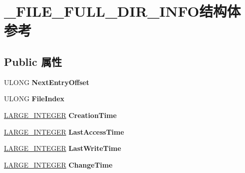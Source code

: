 \hypertarget{struct___f_i_l_e___f_u_l_l___d_i_r___i_n_f_o}{}\section{\+\_\+\+F\+I\+L\+E\+\_\+\+F\+U\+L\+L\+\_\+\+D\+I\+R\+\_\+\+I\+N\+F\+O结构体 参考}
\label{struct___f_i_l_e___f_u_l_l___d_i_r___i_n_f_o}
\subsection*{Public 属性}
\begin{DoxyCompactItemize}
\item 
\mbox{\label{struct___f_i_l_e___f_u_l_l___d_i_r___i_n_f_o_a79d90bdd316275b64276872554ab205f}} 
U\+L\+O\+NG {\bfseries Next\+Entry\+Offset}
\item 
\mbox{\label{struct___f_i_l_e___f_u_l_l___d_i_r___i_n_f_o_ab8c4d52027424e8cc7fbd58b5c1a8fe2}} 
U\+L\+O\+NG {\bfseries File\+Index}
\item 
\mbox{\label{struct___f_i_l_e___f_u_l_l___d_i_r___i_n_f_o_ab674d15099d26e9efe96e5d60fbb6e48}} 
\hyperlink{union___l_a_r_g_e___i_n_t_e_g_e_r}{L\+A\+R\+G\+E\+\_\+\+I\+N\+T\+E\+G\+ER} {\bfseries Creation\+Time}
\item 
\mbox{\label{struct___f_i_l_e___f_u_l_l___d_i_r___i_n_f_o_a55bdd588e1bcf9da9371621990f9866c}} 
\hyperlink{union___l_a_r_g_e___i_n_t_e_g_e_r}{L\+A\+R\+G\+E\+\_\+\+I\+N\+T\+E\+G\+ER} {\bfseries Last\+Access\+Time}
\item 
\mbox{\label{struct___f_i_l_e___f_u_l_l___d_i_r___i_n_f_o_a2b98780a6787b3d0cd150fe8e7f179bf}} 
\hyperlink{union___l_a_r_g_e___i_n_t_e_g_e_r}{L\+A\+R\+G\+E\+\_\+\+I\+N\+T\+E\+G\+ER} {\bfseries Last\+Write\+Time}
\item 
\mbox{\label{struct___f_i_l_e___f_u_l_l___d_i_r___i_n_f_o_a0d28e6be2e8987443bc253a2c52f9b85}} 
\hyperlink{union___l_a_r_g_e___i_n_t_e_g_e_r}{L\+A\+R\+G\+E\+\_\+\+I\+N\+T\+E\+G\+ER} {\bfseries Change\+Time}

\end{DoxyCompactItemize}

